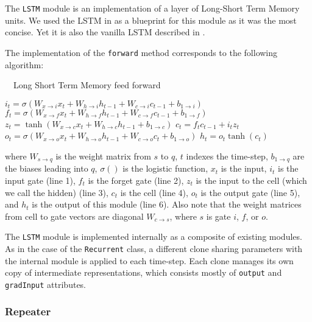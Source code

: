 \documentclass{article} %
\providecommand{\inlinecode}[1]{\texttt{#1}}
\begin{document}
The \inlinecode{LSTM} module is an implementation of a layer of 
Long-Short Term Memory units\cite{hochreiter1997long}. 
We used the LSTM in \cite{graves2013speech} as a blueprint for this module as it was the most concise. 
Yet it is also the vanilla LSTM described in \cite{greff2015lstm}.



The implementation of the \inlinecode{forward} method corresponds to the following algorithm:

\begin{algorithm}
\caption{~~Long Short Term Memory feed forward}
\label{alg:lstm}
\begin{algorithmic}[1]
\State $i_t = \sigma(W_{x\rightarrow i}x_t + W_{h\rightarrow i}h_{t-1} + W_{c \rightarrow i}c_{t-1} + b_{1 \rightarrow i})$
\State $f_t = \sigma(W_{x\rightarrow f}x_t + W_{h\rightarrow f}h_{t-1} + W_{c\rightarrow f}c_{t-1} + b_{1\rightarrow f})$
\State $z_t = \tanh(W_{x\rightarrow c}x_t + W_{h\rightarrow c}h_{t−1} + b_{1\rightarrow c})$
\State $c_t = f_t c_{t-1} + i_t z_t$
\State $o_t = \sigma(W_{x\rightarrow o}x_t + W_{h\rightarrow o}h_{t−1} + W_{c\rightarrow o}c_t + b_{1\rightarrow o})$
\State $h_t = o_t\tanh(c_t)$
\end{algorithmic}
\end{algorithm}

where $W_{s\rightarrow q}$ is the weight matrix from $s$ to $q$, $t$ indexes the time-step, 
$b_{1\rightarrow q}$ are the biases leading into $q$, $\sigma()$ is the logistic function, 
$x_t$ is the input, $i_t$ is the input gate (line 1), $f_t$ is the forget gate (line 2), 
$z_t$ is the input to the cell (which we call the hidden) (line 3), $c_t$ is the cell (line 4), 
$o_t$ is the output gate (line 5), and $h_t$ is the output of this module (line 6). 
Also note that the weight matrices from cell to gate vectors are diagonal $W_{c\rightarrow s}$, 
where $s$ is gate $i$, $f$, or $o$.

The \inlinecode{LSTM} module is implemented internally as a composite of existing modules.
As in the case of the \inlinecode{Recurrent} class, a different clone sharing parameters with the internal module 
is applied to each time-step. Each clone manages its own copy of intermediate representations, 
which consists mostly of \inlinecode{output} and \inlinecode{gradInput} attributes.

\subsubsection{Repeater}
\end{document}
